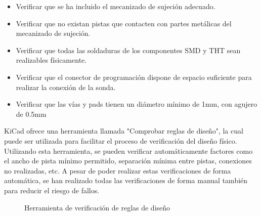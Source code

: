 \begin{itemize}
    \item Verificar que se ha incluido el mecanizado de sujeción adecuado.
    
    \item Verificar que no existan pistas que contacten con partes metálicas del mecanizado de sujeción.
    
    \item Verificar que todas las soldaduras de los componentes SMD y THT sean realizables físicamente.
    
    \item Verificar que el conector de programación dispone de espacio suficiente para realizar la conexión de la sonda.
    
    \item Verificar que las vías y pads tienen un diámetro mínimo de 1mm, con agujero de 0.5mm
    
\end{itemize}

KiCad ofrece una herramienta llamada "Comprobar reglas de diseño", la cual puede ser utilizada para facilitar el proceso de verificación del diseño físico. Utilizando esta herramienta, se pueden verificar automáticamente factores como el ancho de pista mínimo permitido, separación mínima entre pistas, conexiones no realizadas, etc. A pesar de poder realizar estas verificaciones de forma automática, se han realizado todas las verificaciones de forma manual también para reducir el riesgo de fallos.

    \begin{figure}[htbp]
    \centering
    \caption{Herramienta de verificación de reglas de diseño} \label{fig:lego}
    \end{figure}

